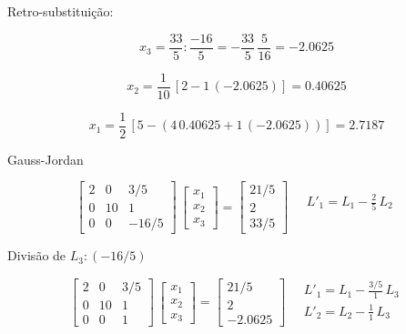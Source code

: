 \begin{example}
Retro-substituição:

\[
 x_3 = \frac{33}{5} : \frac{-16}{5} = - \frac{33}{5} \, \frac{5}{16} = -2.0625
\]

\[
 x_2 = \frac{1}{10} \, [2 - 1 \, (-2.0625)] = 0.40625
\]

\[
 x_1 = \frac{1}{2} \, [5 - (4\,0.40625 + 1\,(-2.0625))] = 2.7187
\]

Gauss-Jordan

\[
 \left[
 \begin{array}{rrr}
   2 & 0 & 3/5 \\
   0 & 10 & 1 \\
   0 & 0 & -16/5
 \end{array}
 \right]
 \,
 \left[
 \begin{array}{r}
   x_1 \\
   x_2 \\
   x_3
 \end{array}
 \right]
 =
 \left[
 \begin{array}{r}
   21/5 \\
   2 \\
   33/5
 \end{array}
 \right]
 \quad
 \begin{array}{l}
   L'_1 = L_1 - \frac{2}{5}\,L_2 \\
   \\
   \,
 \end{array}
\]

Divisão de $L_{3} : (-16/5)$

\[
 \left[
 \begin{array}{rrr}
   2 & 0 & 3/5 \\
   0 & 10 & 1 \\
   0 & 0 & 1
 \end{array}
 \right]
 \,
 \left[
 \begin{array}{r}
   x_1 \\
   x_2 \\
   x_3
 \end{array}
 \right]
 =
 \left[
 \begin{array}{r}
   21/5 \\
   2 \\
   -2.0625
 \end{array}
 \right]
 \quad
 \begin{array}{l}
   L'_1 = L_1 - \frac{3/5}{1}\,L_3 \\
   L'_2 = L_2 - \frac{1}{1}\,L_3 \\
   \,
 \end{array}
\]


\end{example}
